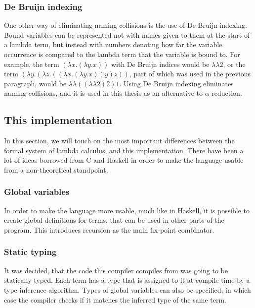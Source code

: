 \documentclass[12pt]{article}
\begin{document}
\subsubsection{De Bruijn indexing}

One other way of eliminating naming collisions is the use of De Bruijn indexing.
Bound variables can be represented not with names given to them at the start of
a lambda term, but instead with numbers denoting how far the variable occurrence
is compared to the lambda term that the variable is bound to. For example, the
term $(\lambda x. (\lambda y. x))$ with De Bruijn indices would be $\lambda
\lambda 2$, or the term $(\lambda y. (\lambda z. ((\lambda x. (\lambda y. x)) y)
z))$, part of which was used in the previous paragraph, would be $\lambda
\lambda ((\lambda \lambda 2) 2) 1$. Using De Bruijn indexing eliminates naming
collisions, and it is used in this thesis as an alternative to
$\alpha$-reduction.

\subsection{This implementation}

In this section, we will touch on the most important differences between the
formal system of lambda calculus, and this implementation. There have been a lot
of ideas borrowed from C and Haskell in order to make the language usable from a
non-theoretical standpoint.

\subsubsection{Global variables}

In order to make the language more usable, much like in Haskell, it is possible
to create global definitions for terms, that can be used in other parts of the
program. This introduces recursion as the main fix-point combinator.

\subsubsection{Static typing}

It was decided, that the code this compiler compiles from was going to be
statically typed. Each term has a type that is assigned to it at compile time by
a type inference algorithm. Types of global variables can also be specified, in
which case the compiler checks if it matches the inferred type of the same
term.
\end{document}
